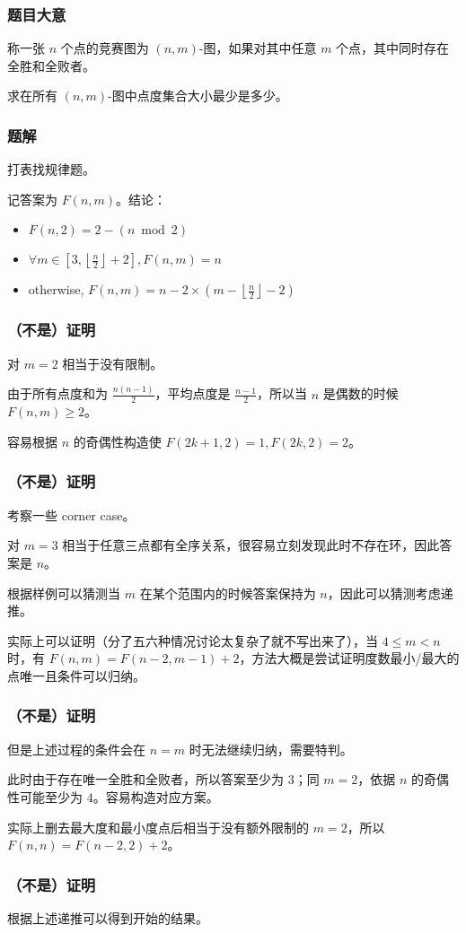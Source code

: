 \frame
{
  \frametitle{题目大意}

 	称一张 $n$ 个点的竞赛图为 $(n,m)$-图，如果对其中任意 $m$ 个点，其中同时存在全胜和全败者。

	求在所有 $(n,m)$-图中点度集合大小最少是多少。

}

\frame
{


  \frametitle{题解}

	打表找规律题。	

	记答案为 $F(n,m)$。结论：
	
	\begin{itemize}

	\item $F(n, 2)=2 - (n \bmod 2)$
	\item $\forall m\in\left[3, \left\lfloor\frac{n}{2}\right\rfloor+2\right], F(n, m) = n$
	\item otherwise, $F(n, m) = n - 2\times \left(m - \left\lfloor\frac{n}{2}\right\rfloor - 2\right)$

	\end{itemize}

}

\frame
{
  \frametitle{（不是）证明}

对 $m=2$ 相当于没有限制。\pause

由于所有点度和为 $\frac{n(n-1)}{2}$，平均点度是 $\frac{n-1}{2}$，所以当 $n$ 是偶数的时候 $F(n, m)\ge 2$。\pause

容易根据 $n$ 的奇偶性构造使 $F(2k+1, 2)=1, F(2k, 2)=2$。

}

\frame
{
  \frametitle{（不是）证明}

	考察一些 corner case。\pause

	对 $m=3$ 相当于任意三点都有全序关系，很容易立刻发现此时不存在环，因此答案是 $n$。\pause

	根据样例可以猜测当 $m$ 在某个范围内的时候答案保持为 $n$，因此可以猜测考虑递推。\pause

	实际上可以证明（分了五六种情况讨论太复杂了就不写出来了），当 $4\le m<n$ 时，有 $F(n,m)=F(n-2, m-1)+2$，方法大概是尝试证明度数最小/最大的点唯一且条件可以归纳。

}

\frame
{
  \frametitle{（不是）证明}

	但是上述过程的条件会在 $n=m$ 时无法继续归纳，需要特判。\pause

	此时由于存在唯一全胜和全败者，所以答案至少为 $3$；同 $m=2$，依据 $n$ 的奇偶性可能至少为 $4$。容易构造对应方案。\pause

	实际上删去最大度和最小度点后相当于没有额外限制的 $m=2$，所以 $F(n,n)=F(n-2,2)+2$。

}


\frame
{
  \frametitle{（不是）证明}

	根据上述递推可以得到开始的结果。

}
